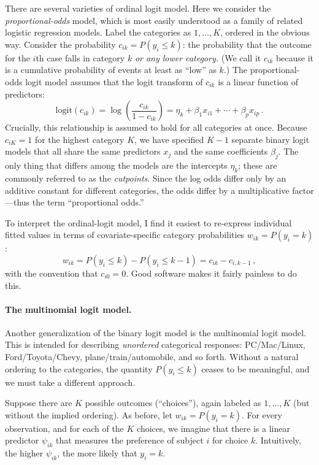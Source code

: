 \documentclass[11pt]{article}
\newcommand{\1}[1]{\mathbf{1}_{\{ {#1} \}}}
\begin{document}
There are several varieties of ordinal logit model.  Here we consider the \textit{proportional-odds} model, which is most easily understood as a family of related logistic regression models.  Label the categories as $1, \ldots, K$, ordered in the obvious way.  Consider the probability $c_{ik} = P(y_i \leq k)$: the probability that the outcome for the $i$th case falls in category $k$ \textit{or any lower category.}  (We call it $c_{ik}$ because it is a cumulative probability of events at least as ``low'' as $k$.)  The proportional-odds logit model assumes that the logit transform of $c_{ik}$ is a linear function of predictors:
$$
\mbox{logit}(c_{ik}) = \log \left( \frac{c_{ik}}{1-c_{ik}} \right) = \eta_k + \beta_1 x_{i1} + \cdots + \beta_p x_{ip} \, .
$$
Crucially, this relationship is assumed to hold for all categories at once.  Because $c_{iK} = 1$ for the highest category $K$, we have specified $K-1$ separate binary logit models that all share the same predictors $x_j$ and the same coefficients $\beta_j$.   The only thing that differs among the models are the intercepts $\eta_k$; these are commonly referred to as the \textit{cutpoints}.  Since the log odds differ only by an additive constant for different categories, the odds differ by a multiplicative factor---thus the term ``proportional odds.''

To interpret the ordinal-logit model, I find it easiest to re-express individual fitted values in terms of covariate-specific category probabilities $w_{ik} = P(y_i = k)$:
$$
w_{ik} =  P(y_i  \leq k) - P(y_i \leq k-1) = c_{ik} - c_{i, k-1} \, ,
$$
with the convention that $c_{i0} = 0$. Good software makes it fairly painless to do this.


\paragraph{The multinomial logit model.}

Another generalization of the binary logit model is the multinomial logit model.  This is intended for describing \textit{unordered} categorical responses: PC/Mac/Linux, Ford/Toyota/Chevy, plane/train/automobile, and so forth.  Without a natural ordering to the categories, the quantity $P(y_i \leq k)$ ceases to be meaningful, and we must take a different approach.

Suppose there are $K$ possible outcomes (``choices''), again labeled as $1, \ldots, K$ (but without the implied ordering).  As before, let $w_{ik} = P(y_i = k)$.   For every observation, and for each of the $K$ choices, we imagine that there is a linear predictor $\psi_{ik}$ that measures the preference of subject $i$ for choice $k$.  Intuitively, the higher $\psi_{ik}$, the more likely that $y_i = k$.
\end{document}

